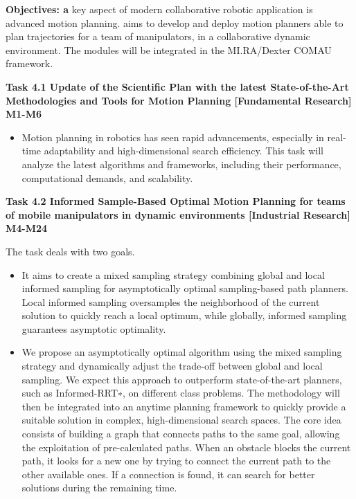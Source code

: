 \begin{planactivitybody}
\textbf{Objectives: a} key aspect of modern collaborative robotic
application is advanced motion planning.  aims to
develop and deploy motion planners able to plan trajectories for a team
of manipulators, in a collaborative dynamic environment. The modules
will be integrated in the MI.RA/Dexter COMAU framework.

\plantaskskip
\textbf{Task 4.1 Update of the Scientific Plan with the latest
State-of-the-Art Methodologies and Tools for Motion Planning
{[}Fundamental Research{]} M1-M6}

\begin{itemize}
\item
  Motion planning in robotics has seen rapid advancements, especially in
  real-time adaptability and high-dimensional search efficiency. This
  task will analyze the latest algorithms and frameworks, including
  their performance, computational demands, and scalability.
\end{itemize}

\plantaskskip
\textbf{Task 4.2 Informed Sample-Based Optimal Motion Planning for teams
of mobile manipulators in dynamic environments {[}Industrial Research{]}
M4-M24}

The task deals with two goals.

\begin{itemize}
\item
  It aims to create a mixed sampling strategy combining global and local
  informed sampling for asymptotically optimal sampling-based path
  planners. Local informed sampling oversamples the neighborhood of the
  current solution to quickly reach a local optimum, while globally,
  informed sampling guarantees asymptotic optimality.
\item
  We propose an asymptotically optimal algorithm using the mixed
  sampling strategy and dynamically adjust the trade-off between global
  and local sampling. We expect this approach to outperform
  state-of-the-art planners, such as Informed-RRT{∗}, on different class
  problems. The methodology will then be integrated into an anytime
  planning framework to quickly provide a suitable solution in complex,
  high-dimensional search spaces. The core idea consists of building a
  graph that connects paths to the same goal, allowing the exploitation
  of pre-calculated paths. When an obstacle blocks the current path, it
  looks for a new one by trying to connect the current path to the other
  available ones. If a connection is found, it can search for better
  solutions during the remaining time.
\end{itemize}


\end{planactivitybody}
